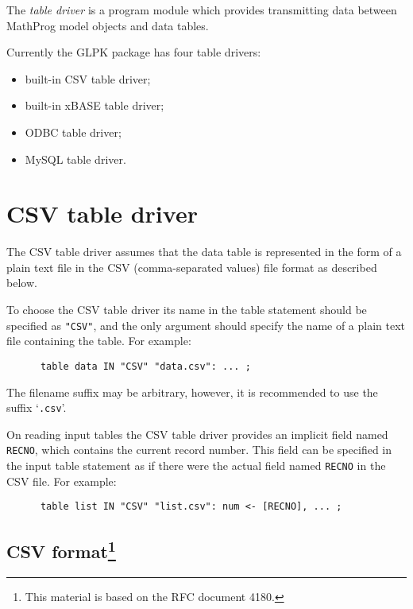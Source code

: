 \documentclass[11pt]{report}
\begin{document}
\bigskip\bigskip

The {\it table driver} is a program module which provides transmitting
data between MathProg model objects and data tables.

Currently the GLPK package has four table drivers:

\vspace*{-8pt}

\begin{itemize}
\item built-in CSV table driver;
\item built-in xBASE table driver;
\item ODBC table driver;
\item MySQL table driver.
\end{itemize}

\vspace*{-8pt}

\section{CSV table driver}

The CSV table driver assumes that the data table is represented in the
form of a plain text file in the CSV (comma-separated values) file
format as described below.

To choose the CSV table driver its name in the table statement should
be specified as \verb|"CSV"|, and the only argument should specify the
name of a plain text file containing the table. For example:

\begin{verbatim}
      table data IN "CSV" "data.csv": ... ;
\end{verbatim}

The filename suffix may be arbitrary, however, it is recommended to use
the suffix `\verb|.csv|'.

On reading input tables the CSV table driver provides an implicit field
named \verb|RECNO|, which contains the current record number. This
field can be specified in the input table statement as if there were
the actual field named \verb|RECNO| in the CSV file. For example:

\begin{verbatim}
      table list IN "CSV" "list.csv": num <- [RECNO], ... ;
\end{verbatim}

\newpage

\subsection*{CSV format\footnote{This material is based on the RFC
document 4180.}}
\end{document}
